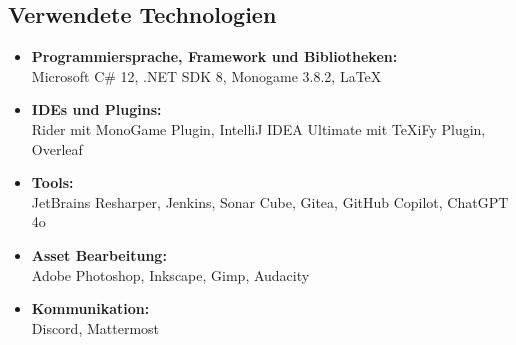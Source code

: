 \subsection{Verwendete Technologien}\label{subsec:verwendete-technologien}

\begin{itemize}
    \item \textbf{Programmiersprache, Framework und Bibliotheken:} \\
    Microsoft C\# 12, .NET SDK 8, Monogame 3.8.2, LaTeX
    \item \textbf{IDEs und Plugins:} \\
    Rider mit MonoGame Plugin, IntelliJ IDEA Ultimate mit TeXiFy Plugin, Overleaf
    \item \textbf{Tools:} \\
    JetBrains Resharper, Jenkins, Sonar Cube, Gitea, GitHub Copilot, ChatGPT 4o
    \item \textbf{Asset Bearbeitung:} \\
    Adobe Photoshop, Inkscape, Gimp, Audacity
    \item \textbf{Kommunikation:} \\
    Discord, Mattermost
\end{itemize}